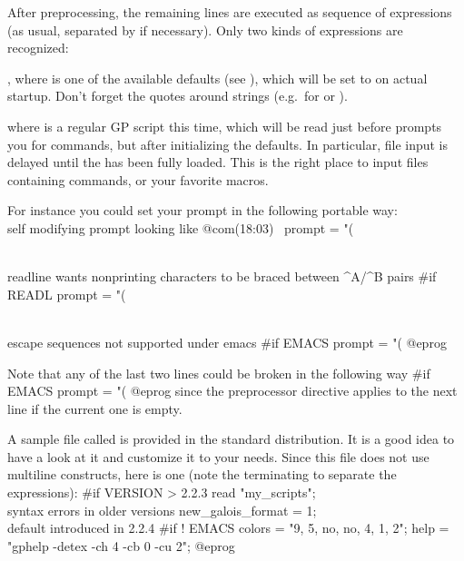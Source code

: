 After preprocessing, the remaining lines are executed as
sequence of expressions (as usual, separated by \kbd{;} if necessary). Only
two kinds of expressions are recognized:

\item {} \kbd{=} , where  is one of
the available defaults (see ), which will be set to
 on actual startup. Don't forget the quotes around strings
(e.g.~for  or ).

\item {} where 
is a regular GP script this time, which will be read just before 
prompts you for commands, but after initializing the defaults. In particular,
file input is delayed until the  has been fully loaded. This is the
right place to input files containing  commands, or your favorite
macros.

\noindent For instance you could set your prompt in the following portable way:
\bprog
\\ self modifying prompt looking like @com\hbox{\rm(18:03) \kbd{ >}}
prompt   = "(%

\\ readline wants nonprinting characters to be braced between ^A/^B pairs
#if READL prompt = "(%

\\ escape sequences not supported under emacs
#if EMACS prompt = "(%
@eprog

\noindent Note that any of the last two lines could be broken in the
following way
\bprog
#if EMACS
  prompt = "(%
@eprog
\noindent since the preprocessor directive applies to the next line if the
current one is empty.

A sample  file called  is provided in the
standard distribution. It is a good idea to have a look at it and customize
it to your needs. Since this file does not use multiline constructs, here is
one (note the terminating \kbd{;} to separate the expressions):
\bprog
#if VERSION > 2.2.3
{
  read "my_scripts";     \\ syntax errors in older versions
  new_galois_format = 1; \\ default introduced in 2.2.4
}
#if ! EMACS
{
  colors = "9, 5, no, no, 4, 1, 2";
  help   = "gphelp -detex -ch 4 -cb 0 -cu 2";
}
@eprog

